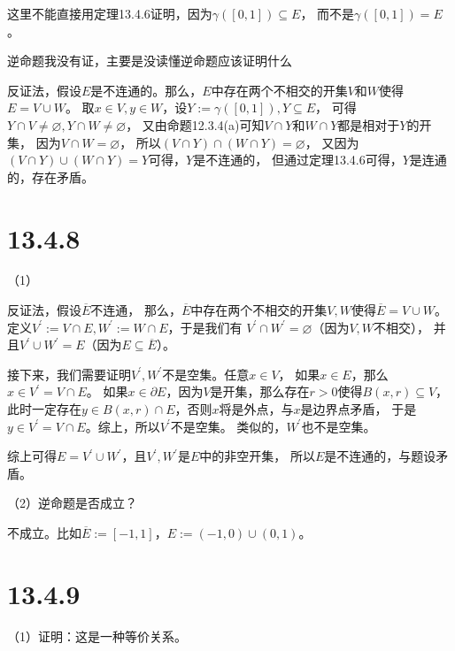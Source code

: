 \documentclass{article}
\begin{document}
\begin{zremark}
  这里不能直接用定理13.4.6证明，因为$\gamma ([0, 1]) \subseteq E$，
  而不是$\gamma ([0, 1]) = E$。
\end{zremark}
\begin{zremark}
  逆命题我没有证，主要是没读懂逆命题应该证明什么
\end{zremark}

反证法，假设$E$是不连通的。那么，$E$中存在两个不相交的开集$V$和$W$使得$E = V \cup W$。
取$x \in V, y \in W$，设$Y := \gamma ([0, 1]), Y \subseteq E$，
可得$Y \cap V \not = \varnothing, Y \cap W \not = \varnothing$，
又由命题12.3.4(a)可知$V \cap Y$和$W \cap Y$都是相对于$Y$的开集，
因为$V \cap W = \varnothing$，
所以$(V \cap Y) \cap (W \cap Y) = \varnothing$，
又因为$(V \cap Y) \cup (W \cap Y) = Y$可得，$Y$是不连通的，
但通过定理13.4.6可得，$Y$是连通的，存在矛盾。

\section*{13.4.8}

（1）

反证法，假设$\overline{E}$不连通，
那么，$\overline{E}$中存在两个不相交的开集$V, W$使得$\overline{E} = V \cup W$。
定义$V^\prime := V \cap E, W^\prime := W \cap E$，于是我们有
$V^\prime \cap W^\prime = \varnothing$（因为$V, W$不相交），
并且$V^\prime \cup W^\prime = E$（因为$E \subseteq \overline{E}$）。

接下来，我们需要证明$V^\prime, W^\prime$不是空集。任意$x \in V$，
如果$x \in E$，那么$x \in V^\prime = V \cap E$。
如果$x \in \partial E$，因为$V$是开集，那么存在$r > 0$使得$B(x, r) \subseteq V$，
此时一定存在$y \in B(x, r) \cap E$，否则$x$将是外点，与$x$是边界点矛盾，
于是$y \in V^\prime = V \cap E$。综上，所以$V^\prime$不是空集。
类似的，$W^\prime$也不是空集。

综上可得$E = V^\prime \cup W^\prime$，且$V^\prime, W^\prime$是$E$中的非空开集，
所以$E$是不连通的，与题设矛盾。

（2）逆命题是否成立？

不成立。比如$\overline{E} := [-1, 1]$，$E := (-1, 0) \cup (0, 1)$。

\section*{13.4.9}

（1）证明：这是一种等价关系。
\end{document}

